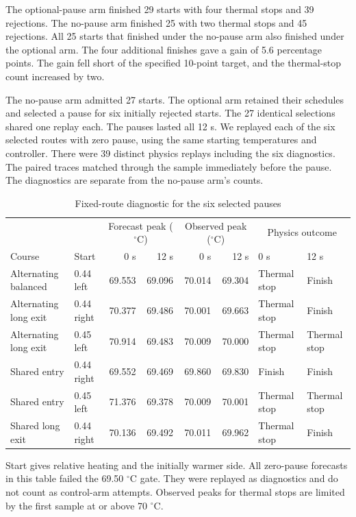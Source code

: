 \documentclass{ieeeaccess}
\begin{document}
The optional-pause arm finished 29 starts with four thermal stops and 39 rejections. The no-pause arm finished 25 with two thermal stops and 45 rejections. All 25 starts that finished under the no-pause arm also finished under the optional arm. The four additional finishes gave a gain of 5.6 percentage points. The gain fell short of the specified 10-point target, and the thermal-stop count increased by two.

The no-pause arm admitted 27 starts. The optional arm retained their schedules and selected a pause for six initially rejected starts. The 27 identical selections shared one replay each. The pauses lasted all 12 s. We replayed each of the six selected routes with zero pause, using the same starting temperatures and controller. There were 39 distinct physics replays including the six diagnostics. The paired traces matched through the sample immediately before the pause. The diagnostics are separate from the no-pause arm's counts.

\begin{table}[!t]
\caption{Fixed-route diagnostic for the six selected pauses}
\label{tab:matched-same-route}
\centering
\footnotesize
\renewcommand{\arraystretch}{1.12}
\begin{tabular}{@{}llrrrrll@{}}
\hline
& & \multicolumn{2}{c}{Forecast peak (\ensuremath{{}^{\circ}\mathrm{C}})}
  & \multicolumn{2}{c}{Observed peak (\ensuremath{{}^{\circ}\mathrm{C}})}
  & \multicolumn{2}{c}{Physics outcome} \\
Course & Start & 0 s & 12 s & 0 s & 12 s & 0 s & 12 s \\
\hline
Alternating balanced & 0.44 left & 69.553 & 69.096 & 70.014 & 69.304 & Thermal stop & Finish \\
Alternating long exit & 0.44 right & 70.377 & 69.486 & 70.001 & 69.663 & Thermal stop & Finish \\
Alternating long exit & 0.45 left & 70.914 & 69.483 & 70.009 & 70.000 & Thermal stop & Thermal stop \\
Shared entry & 0.44 right & 69.552 & 69.469 & 69.860 & 69.830 & Finish & Finish \\
Shared entry & 0.45 left & 71.376 & 69.378 & 70.009 & 70.001 & Thermal stop & Thermal stop \\
Shared long exit & 0.44 right & 70.136 & 69.492 & 70.011 & 69.962 & Thermal stop & Finish \\
\hline
\end{tabular}

\smallskip
\parbox{.96\textwidth}{Start gives relative heating and the initially warmer side. All zero-pause forecasts in this table failed the 69.50 \ensuremath{{}^{\circ}\mathrm{C}} gate. They were replayed as diagnostics and do not count as control-arm attempts. Observed peaks for thermal stops are limited by the first sample at or above 70 \ensuremath{{}^{\circ}\mathrm{C}}.}
\end{table}
\end{document}

